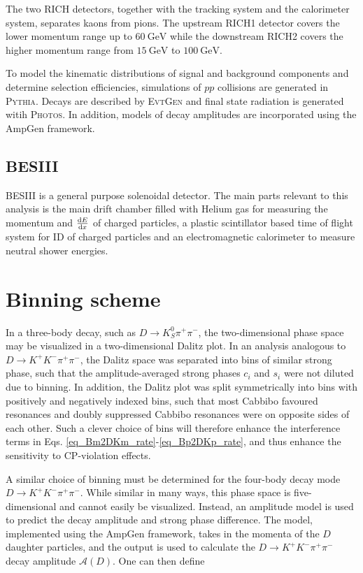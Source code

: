 \documentclass[12pt, a4paper, notitlepage, onecolumn]{article}
\def\pythia{\mbox{\textsc{Pythia}}\xspace}
\def\evtgen{\mbox{\textsc{EvtGen}}\xspace}
\def\photos{\mbox{\textsc{Photos}}\xspace}
\numberwithin{equation}{section}
\begin{document}
The two RICH detectors, together with the tracking system and the calorimeter system, separates kaons from pions. The upstream RICH1 detector covers the lower momentum range up to $\SI{60}{\giga\eV}$ while the downstream RICH2 covers the higher momentum range from $\SI{15}{\giga\eV}$ to $\SI{100}{\giga\eV}$.

To model the kinematic distributions of signal and background components and determine selection efficiencies, simulations of $pp$ collisions are generated in \pythia. Decays are described by \evtgen and final state radiation is generated witih \photos. In addition, models of decay amplitudes are incorporated using the AmpGen framework.
\subsection{BESIII}
\noindent BESIII\cite{cite_BESIII} is a general purpose solenoidal detector. The main parts relevant to this analysis is the main drift chamber filled with Helium gas for measuring the momentum and $\dv{E}{x}$ of charged particles, a plastic scintillator based time of flight system for ID of charged particles and an electromagnetic calorimeter to measure neutral shower energies.

\section{Binning scheme}
\label{section_binning_scheme}
\noindent In a three-body decay, such as $D\to K_S^0\pi^+\pi^-$, the two-dimensional phase space may be visualized in a two-dimensional Dalitz plot. In an analysis analogous to $D\to K^+K^-\pi^+\pi^-$, the Dalitz space was separated into bins of similar strong phase, such that the amplitude-averaged strong phases $c_i$ and $s_i$ were not diluted due to binning. In addition, the Dalitz plot was split symmetrically into bins with positively and negatively indexed bins, such that most Cabbibo favoured resonances and doubly suppressed Cabbibo resonances were on opposite sides of each other. Such a clever choice of bins will therefore enhance the interference terms in Eqs. \eqref{eq_Bm2DKm_rate}-\eqref{eq_Bp2DKp_rate}, and thus enhance the sensitivity to CP-violation effects.

A similar choice of binning must be determined for the four-body decay mode $D\to K^+K^-\pi^+\pi^-$. While similar in many ways, this phase space is five-dimensional and cannot easily be visualized. Instead, an amplitude model is used to predict the decay amplitude and strong phase difference. The model, implemented using the AmpGen framework\cite{cite_AmpGen}, takes in the momenta of the $D$ daughter particles, and the output is used to calculate the $D\to K^+K^-\pi^+\pi^-$ decay amplitude $\mathcal{A}(D)$. One can then define
\end{document}
